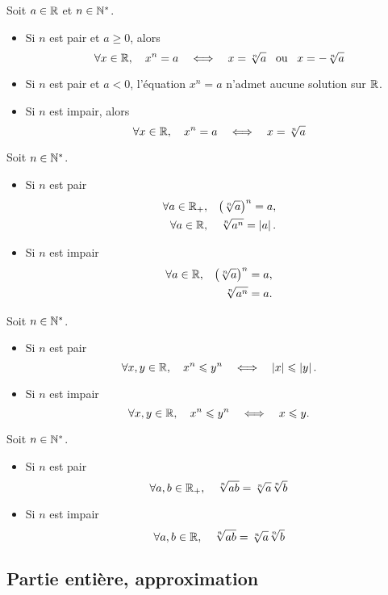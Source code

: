 \documentclass{magnolia}
\begin{document}
\begin{remarques}
\remarque Soit $a\in\mathbb{R}$ et $n\in{\mathbb{N}^*}$.
  \begin{itemize}
  \item Si $n$ est pair et $a\geq 0$, alors
    \[\forall x\in\mathbb{R},\quad x^n=a \quad\Longleftrightarrow\quad x=\sqrt[n]{a} \quad\!\text{ou}\quad\! x=-\sqrt[n]{a}\]
  \item Si $n$ est pair et $a< 0$, l'équation $x^n=a$ n'admet aucune solution sur $\mathbb{R}$.
  \item Si $n$ est impair, alors
    \[\forall x\in\mathbb{R},\quad x^n=a \quad\Longleftrightarrow\quad x=\sqrt[n]{a}\]
  \end{itemize}
\remarque Soit $n\in{\mathbb{N}^*}$.
  \begin{itemize}
  \item Si $n$ est pair
  \begin{eqnarray*}
  \forall a\in\mathbb{R}_+, & & \left(\sqrt[n]{a}\right)^n=a,\\
  \forall a\in\mathbb{R}, & & \sqrt[n]{a^n}=\left|a\right|.
  \end{eqnarray*}
  \item Si $n$ est impair
  \begin{eqnarray*}
  \forall a\in\mathbb{R}, & & \left(\sqrt[n]{a}\right)^n=a,\\
                  & & \sqrt[n]{a^n}=a.
  \end{eqnarray*}
  \end{itemize}
\remarque Soit $n\in{\mathbb{N}^*}$.
  \begin{itemize}
  \item Si $n$ est pair
  \[\forall x,y\in\mathbb{R},\quad x^n\leqslant y^n \quad\Longleftrightarrow\quad \left|x\right|\leqslant\left|y\right|.\]
  \item Si $n$ est impair
  \[\forall x,y\in\mathbb{R},\quad x^n\leqslant y^n \quad\Longleftrightarrow\quad x\leqslant y.\]
  \end{itemize}
\end{remarques}

\begin{proposition}
Soit $n\in{\mathbb{N}^*}$.
\begin{itemize}
\item Si $n$ est pair
  \[\forall a,b\in\mathbb{R}_+,\quad \sqrt[n]{ab}=\sqrt[n]{a}\sqrt[n]{b}\]
\item Si $n$ est impair
  \[\forall a,b\in\mathbb{R},\quad \sqrt[n]{ab}=\sqrt[n]{a}\sqrt[n]{b}\]
\end{itemize}
\end{proposition}

\subsection{Partie entière, approximation}
\end{document}
